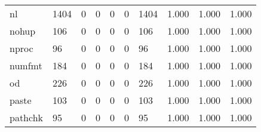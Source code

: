 \begin{longtable}{lp{2.0cm}p{2.0cm}p{2.0cm}p{2.0cm}p{2.0cm}p{2.0cm}p{2.0cm}p{2.0cm}p{2.0cm}}
nl        &                   1404 &                                  0 &                                 0 &                                0 &                                 0 &                            1404 &                                1.000 &                                  1.000 &                                1.000 \\
nohup     &                    106 &                                  0 &                                 0 &                                0 &                                 0 &                             106 &                                1.000 &                                  1.000 &                                1.000 \\
nproc     &                     96 &                                  0 &                                 0 &                                0 &                                 0 &                              96 &                                1.000 &                                  1.000 &                                1.000 \\
numfmt    &                    184 &                                  0 &                                 0 &                                0 &                                 0 &                             184 &                                1.000 &                                  1.000 &                                1.000 \\
od        &                    226 &                                  0 &                                 0 &                                0 &                                 0 &                             226 &                                1.000 &                                  1.000 &                                1.000 \\
paste     &                    103 &                                  0 &                                 0 &                                0 &                                 0 &                             103 &                                1.000 &                                  1.000 &                                1.000 \\
pathchk   &                     95 &                                  0 &                                 0 &                                0 &                                 0 &                              95 &                                1.000 &                                  1.000 &                                1.000 \\

\end{longtable}
